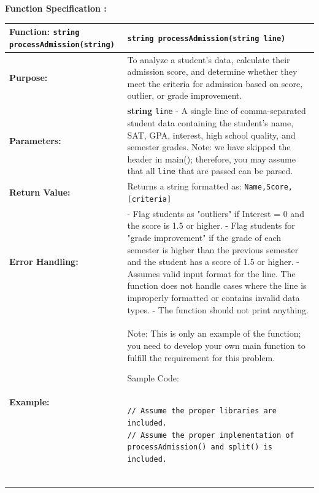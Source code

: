 \textbf{Function Specification :}

\renewcommand{\arraystretch}{1.5} 
\begin{longtable}{|p{1.7in}|p{4.3in}|}
\hline
\textbf{Function:}  \texttt{string processAdmission(string)}& \texttt{string processAdmission(string line)}\\ \hline

\textbf{Purpose:} & To analyze a student's data, calculate their admission score, and determine whether they meet the criteria for admission based on score, outlier, or grade improvement.\\ \hline

\textbf{Parameters:} & 
\textbf{string} \texttt{line} - A single line of comma-separated student data containing the student’s name, SAT, GPA, interest, high school quality, and semester grades. \newline
Note: we have skipped the header in main(); therefore, you may assume that all \texttt{line} that are passed can be parsed.\\ \hline

\textbf{Return Value:} & 
Returns a string formatted as: \texttt{Name,Score,[criteria]}\\ \hline

\textbf{Error Handling:} & 
- Flag students as "outliers" if Interest = 0 and the score is 1.5 or higher. \newline
- Flag students for "grade improvement" if the grade of each semester is higher than the previous semester and the student has a score of 1.5 or higher. \newline
- Assumes valid input format for the line. The function does not handle cases where the line is improperly formatted or contains invalid data types. \newline
- The function should not print anything.\\ \hline

\textbf{Example:}& 

Note: This is only an example of the function; you need to develop your own main function to fulfill the requirement for this problem.

Sample Code:

\begin{example}
        \begin{verbatim}

// Assume the proper libraries are included.
// Assume the proper implementation of processAdmission() and split() is included.


\end{verbatim}
\end{example}
\end{longtable}

